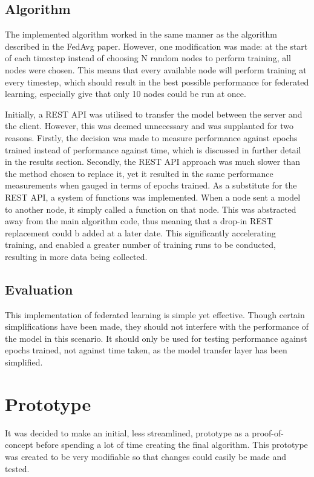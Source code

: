 \subsection{Algorithm}
The implemented algorithm worked in the same manner as the algorithm described in the FedAvg paper. However, one modification was made: at the start of each timestep instead of choosing N random nodes to perform training, all nodes were chosen. This means that every available node will perform training at every timestep, which should result in the best possible performance for federated learning, especially give that only 10 nodes could be run at once.

Initially, a REST API was utilised to transfer the model between the server and the client. However, this was deemed unnecessary and was supplanted for two reasons. Firstly, the decision was made to measure performance against epochs trained instead of performance against time, which is discussed in further detail in the results section. Secondly, the REST API approach was much slower than the method chosen to replace it, yet it resulted in the same performance measurements when gauged in terms of epochs trained. As a substitute for the REST API, a system of functions was implemented. When a node sent a model to another node, it simply called a function on that node. This was abstracted away from the main algorithm code, thus meaning that a drop-in REST replacement could b added at a later date. This significantly accelerating training, and enabled a greater number of training runs to be conducted, resulting in more data being collected.

\subsection{Evaluation}
This implementation of federated learning is simple yet effective. Though certain simplifications have been made, they should not interfere with the performance of the model in this scenario. It should only be used for testing performance against epochs trained, not against time taken, as the model transfer layer has been simplified.

\section{Prototype}
It was decided to make an initial, less streamlined, prototype as a proof-of-concept before spending a lot of time creating the final algorithm. This prototype was created to be very modifiable so that changes could easily be made and tested.

